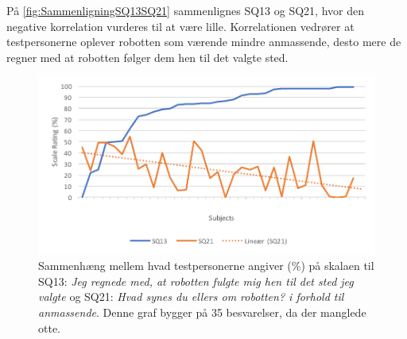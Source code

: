 \noindent
%
På \autoref{fig:SammenligningSQ13SQ21} sammenlignes SQ13 og SQ21, hvor den negative korrelation vurderes til at være lille. Korrelationen vedrører at testpersonerne oplever robotten som værende mindre anmassende, desto mere de regner med at robotten følger dem hen til det valgte sted.
%
\begin{figure}[H]
	\centering
	\includegraphics[width=\textwidth]{Figure/Korrelationsgrafer/SQ13+SQ21}
	\caption{Sammenhæng mellem hvad testpersonerne angiver (\%) på skalaen til SQ13: \textit{Jeg regnede med, at robotten fulgte mig hen til det sted jeg valgte} og SQ21: \textit{Hvad synes du ellers om robotten? i forhold til \textit{anmassende}}. Denne graf bygger på 35 besvarelser, da der manglede otte.}
	\label{fig:SammenligningSQ13SQ21}
\end{figure}
\noindent
%